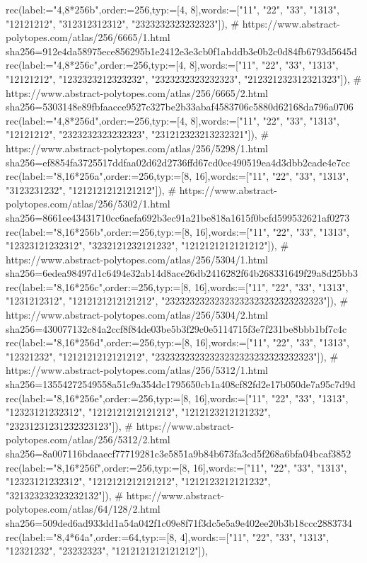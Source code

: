 \documentclass[11pt,a4paper]{article}
\begin{document}
\begin{CompleteProgram}
rec(label:="{4,8}*256b",order:=256,typ:=[4, 8],words:=["11", "22", "33", "1313", "12121212", "312312312312", "2323232323232323"]),
# https://www.abstract-polytopes.com/atlas/256/6665/1.html sha256=912e4da58975ece856295b1e2412e3e3cb0f1abddb3e0b2c0d84fb6793d5645d
rec(label:="{4,8}*256c",order:=256,typ:=[4, 8],words:=["11", "22", "33", "1313", "12121212", "1232323212323232", "2323232323232323", "212321232312321323"]),
# https://www.abstract-polytopes.com/atlas/256/6665/2.html sha256=5303148e89fbfaacce9527c327be2b33abaf4583706c5880d62168da796a0706
rec(label:="{4,8}*256d",order:=256,typ:=[4, 8],words:=["11", "22", "33", "1313", "12121212", "2323232323232323", "231212323213232321"]),
# https://www.abstract-polytopes.com/atlas/256/5298/1.html sha256=ef8854fa3725517ddfaa02d62d2736ffd67cd0ce490519ea4d3dbb2cade4e7cc
rec(label:="{8,16}*256a",order:=256,typ:=[8, 16],words:=["11", "22", "33", "1313", "3123231232", "1212121212121212"]),
# https://www.abstract-polytopes.com/atlas/256/5302/1.html sha256=8661ee43431710cc6aefa692b3ec91a21be818a1615f0bcfd599532621af0273
rec(label:="{8,16}*256b",order:=256,typ:=[8, 16],words:=["11", "22", "33", "1313", "12323121232312", "3232121232121232", "1212121212121212"]),
# https://www.abstract-polytopes.com/atlas/256/5304/1.html sha256=6edea98497d1c6494e32ab14d8ace26db2416282f64b268331649f29a8d25bb3
rec(label:="{8,16}*256c",order:=256,typ:=[8, 16],words:=["11", "22", "33", "1313", "1231212312", "1212121212121212", "23232323232323232323232323232323"]),
# https://www.abstract-polytopes.com/atlas/256/5304/2.html sha256=430077132c84a2ccf8f84de03be5b3f29c0e5114715f3e7f231be8bbb1bf7c4c
rec(label:="{8,16}*256d",order:=256,typ:=[8, 16],words:=["11", "22", "33", "1313", "12321232", "1212121212121212", "23232323232323232323232323232323"]),
# https://www.abstract-polytopes.com/atlas/256/5312/1.html sha256=13554272549558a51c9a354dc1795650cb1a408cf82fd2e17b050de7a95c7d9d
rec(label:="{8,16}*256e",order:=256,typ:=[8, 16],words:=["11", "22", "33", "1313", "12323121232312", "1212121212121212", "1212123212121232", "23231231231232323123"]),
# https://www.abstract-polytopes.com/atlas/256/5312/2.html sha256=8a007116bdaaecf77719281c3e5851a9b84b673fa3cd5f268a6bfa04bcaf3852
rec(label:="{8,16}*256f",order:=256,typ:=[8, 16],words:=["11", "22", "33", "1313", "12323121232312", "1212121212121212", "1212123212121232", "321323232323232132"]),
# https://www.abstract-polytopes.com/atlas/64/128/2.html sha256=509ded6ad933dd1a54a042f1c09e8f71f3dc5e5a9e402ee20b3b18ccc2883734
rec(label:="{8,4}*64a",order:=64,typ:=[8, 4],words:=["11", "22", "33", "1313", "12321232", "23232323", "1212121212121212"]),

\end{CompleteProgram}
\end{document}
